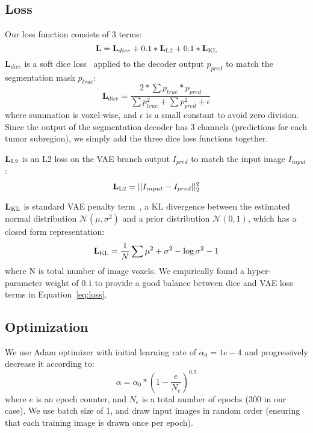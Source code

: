 \documentclass[runningheads]{llncs}
\newcommand{\LL}{\ensuremath{\mathbf{L}}}
\newcommand{\0}{\ensuremath{\mathbf{0}}}
\newcommand{\1}{\ensuremath{\mathbf{1}}}
\begin{document}
 
 \subsection{Loss}
 Our loss function consists of 3 terms:
  \begin{equation}
 \label{eq:loss}
 \LL =\LL_{dice} + 0.1*\LL_{\textsc{L2}} + 0.1*\LL_{\textsc{KL}}   
 \end{equation}
$\LL_{dice}$ is a soft dice loss~\cite{Milletari16} applied to the  decoder output $p_{pred}$ to match the segmentation mask $p_{true}$:
   \begin{equation}
  \label{eq:dice}
  \LL_{dice}  = \frac{2*\sum p_{true} * p_{pred} }{\sum p_{true}^2 + \sum p_{pred}^2 + \epsilon}   
  \end{equation}
where summation is voxel-wise, and $\epsilon$ is a small constant to avoid zero division. Since the output of the segmentation decoder has 3 channels (predictions for each tumor subregion), we simply add the three dice loss functions together. 

$\LL_{\textsc{L2}}$ is an L2 loss on the VAE branch output $I_{pred}$ to match the input image $I_{input}$:
   \begin{equation}
  	\label{eq:vael2}
  	\LL_{\textsc{L2}}   =|| I_{input} - I_{pred}||_2^2
  \end{equation}
  
$\LL_{\textsc{KL}}$  is standard VAE penalty term~\cite{Kingma14,doersch2016vae}, a KL divergence between the estimated normal distribution $\mathcal{N}(\mu,\sigma^2)$ and a prior distribution $\mathcal{N}(0,1)$, which has a closed form representation:
 \begin{equation}
\label{eq:vaekl}
\LL_{\textsc{KL}} =  \frac{1}{N} \sum  \mu^2  + \sigma^2 -  \log \sigma^2 -1
\end{equation}
where N is total number of image voxels. We empirically found a hyper-parameter weight of $0.1$ to provide a good balance between dice and VAE loss terms in Equation~\ref{eq:loss}.
    
               
  	
 \subsection{Optimization}
 We use Adam optimizer with initial learning rate of $ \alpha_{0} = 1e-4$ and progressively decrease it according to:
 \begin{equation}
 \label{eq:learningrate}
 \alpha = \alpha_{0} *\left(1-\frac{e}{N_{e}}\right)^{0.9}  
 \end{equation}
 where $e$ is an epoch counter, and $N_{e}$ is a total number of epochs (300 in our case). 
 We use batch size of 1, and draw input images in random order (ensuring that each training image is drawn once per epoch). 
 
\end{document}
